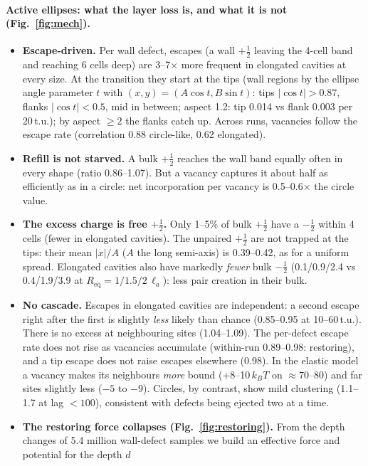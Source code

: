 \documentclass[11pt,a4paper]{article}
\newcommand{\half}{\tfrac12}
\newcommand{\la}{\ell_a}
\newcommand{\kT}{k_BT}
\begin{document}
\paragraph{Active ellipses: what the layer loss is, and what it is not (Fig.~\ref{fig:mech}).}
\begin{itemize}
  \item \textbf{Escape-driven.} Per wall defect, escapes (a wall $+\half$ leaving the 4-cell band and reaching 6 cells deep) are 3--7$\times$ more frequent in elongated cavities at every size. At the transition they start at the tips
        (wall regions by the ellipse angle parameter $t$ with $(x,y)=(A\cos t,B\sin t)$: tips $|\cos t|>0.87$, flanks $|\cos t|<0.5$, mid in between; aspect 1.2: tip 0.014 vs flank 0.003 per 20\,t.u.); by aspect $\ge2$ the flanks catch up. Across runs, vacancies follow the escape rate (correlation 0.88 circle-like, 0.62 elongated).
  \item \textbf{Refill is not starved.} A bulk $+\half$ reaches the wall band equally often in every shape (ratio 0.86--1.07). But a vacancy captures it about half as
        efficiently as in a circle: net incorporation per vacancy is 0.5--0.6$\times$ the circle value.
  \item \textbf{The excess charge is free $+\half$.} Only 1--5\% of bulk $+\half$ have a $-\half$ within 4 cells (fewer in elongated cavities). The unpaired $+\half$ are not trapped at
        the tips: their mean $|x|/A$ ($A$ the long semi-axis) is 0.39--0.42, as for a uniform spread. Elongated cavities also have markedly \emph{fewer} bulk $-\half$ (0.1/0.9/2.4 vs 0.4/1.9/3.9 at
        $R_\mathrm{eq}=1/1.5/2\,\la$): less pair creation in their bulk.
  \item \textbf{No cascade.} Escapes in elongated cavities are independent: a second escape right after the first is slightly \emph{less} likely than chance (0.85--0.95 at
        10--60\,t.u.). There is no excess at neighbouring sites (1.04--1.09). The per-defect escape rate does not rise as vacancies accumulate (within-run 0.89--0.98: restoring),
        and a tip escape does not raise escapes elsewhere (0.98). In the elastic model a vacancy makes its neighbours \emph{more} bound (+8--10\,$\kT$ on $\approx70$--80) and
        far sites slightly less ($-5$ to $-9$). Circles, by contrast, show mild clustering (1.1--1.7 at lag $<100$), consistent with defects being ejected two at a time.
  \item \textbf{The restoring force collapses (Fig.~\ref{fig:restoring}).} From the depth changes of 5.4 million wall-defect samples we build an effective force and potential for the depth $d$

\end{itemize}
\end{document}
